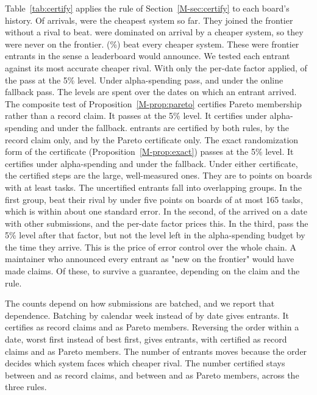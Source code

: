 \documentclass[10pt]{article}
\begin{document}
Table~\ref{tab:certify} applies the rule of Section~\ref{M-sec:certify} to each board's history. Of \NumCertSystems{} arrivals, \NumCertCheapest{} were the cheapest system so far. They joined the frontier without a rival to beat. \NumCertDominated{} were dominated on arrival by a cheaper system, so they were never on the frontier. \NumCertEntrants{} (\NumCertEntrantsPct\%) beat every cheaper system. These were frontier entrants in the sense a leaderboard would announce. We tested each entrant against its most accurate cheaper rival. With only the per-date factor applied, \NumCertUnadjusted{} of the \NumCertEntrants{} pass at the 5\% level. Under alpha-spending \NumCertSpending{} pass, and under the online fallback \NumCertFallback{} pass. The levels are spent over the \NumCertDatesWithEntrants{} dates on which an entrant arrived. The composite test of Proposition~\ref{M-prop:pareto} certifies Pareto membership rather than a record claim. It passes \NumCertIUUnadjusted{} at the 5\% level. It certifies \NumCertIUSpending{} under alpha-spending and \NumCertIUFallback{} under the fallback. \NumCertBothSpending{} entrants are certified by both rules, \NumCertPairNotIU{} by the record claim only, and \NumCertIUNotPair{} by the Pareto certificate only. The exact randomization form of the certificate (Proposition~\ref{M-prop:exact}) passes \NumCertExUnadjusted{} at the 5\% level. It certifies \NumCertExSpending{} under alpha-spending and \NumCertExFallback{} under the fallback. Under either certificate, the certified steps are the large, well-measured ones. They are \NumCertMinMarginPt{} to \NumCertMaxMarginPt{} points on boards with at least \NumCertMinTasks{} tasks. The uncertified entrants fall into overlapping groups. In the first group, \NumCertSmallStepSmallBoard{} beat their rival by under five points on boards of at most 165 tasks, which is within about one standard error. In the second, \NumCertMultiDate{} of the \NumCertEntrants{} arrived on a date with other submissions, and the per-date factor prices this. In the third, \NumCertBudgetExhausted{} pass the 5\% level after that factor, but not the level left in the alpha-spending budget by the time they arrive. This is the price of error control over the whole chain. A maintainer who announced every entrant as "new on the frontier" would have made \NumCertEntrants{} claims. Of these, \NumCertSpending{} to \NumCertMaxAnyRule{} survive a guarantee, depending on the claim and the rule.

The counts depend on how submissions are batched, and we report that dependence. Batching by calendar week instead of by date gives \NumCertWeekEntrants{} entrants. It certifies \NumCertWeekSpending{} as record claims and \NumCertWeekIUSpending{} as Pareto members. Reversing the order within a date, worst first instead of best first, gives \NumCertWorstEntrants{} entrants, with \NumCertWorstSpending{} certified as record claims and \NumCertWorstIUSpending{} as Pareto members. The number of entrants moves because the order decides which system faces which cheaper rival. The number certified stays between \NumCertVariantSpendingMin{} and \NumCertVariantSpendingMax{} as record claims, and between \NumCertVariantIUMin{} and \NumCertVariantIUMax{} as Pareto members, across the three rules.
\end{document}
